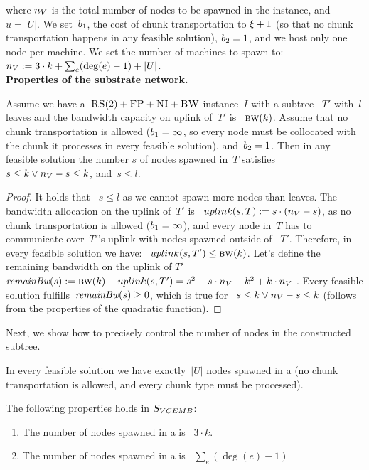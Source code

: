where $n_V$ is the total number of nodes to be spawned in the instance, and $u = |U|$.
  We
set~$b_1$, the cost of chunk transportation to $\xi+1$ (so that no chunk transportation happens in any feasible solution), 
$b_2 = 1$, and we host only one node per machine. We set the
number of machines to spawn to:
$n_V := 3\cdot k + \sum_e (\deg(e)-1) + |U|$.
\\

\noindent \textbf{Properties of the substrate network.}
\begin{lemma}
  Assume we have a~$\textsc{RS}(2)+\textsc{FP}+\textsc{NI}+\textsc{BW}$ instance~$I$ with a subtree
 ~$T'$ with~$l$ leaves and the bandwidth capacity on uplink of~$T'$ is
 ~$\textsc{bw}(k)$. Assume that no chunk transportation is allowed
  ($b_1 = \infty$, so every node must be collocated with the
  chunk it processes in every feasible solution), and~$b_2 = 1$.
  Then in any feasible solution the number $s$ of nodes spawned in~$T$ satisfies~$s \leq k \vee n_V-s\leq k$, and~$s \leq l$.
  \label{lem:bandwidth1}
\end{lemma}

\begin{proof}
It holds that ~$s\leq l$ as we cannot spawn more nodes than leaves.
  The bandwidth allocation on the uplink of~$T'$ is
 ~$uplink(s,T) := s\cdot (n_V - s)$, as no chunk transportation
  is allowed ($b_1 = \infty$), and every node in~$T$ has to
  communicate over~$T'$'s uplink with nodes spawned outside of
 ~$T'$. Therefore, in every feasible solution we have:
 ~$uplink(s, T') \leq \textsc{bw}(k)$.  Let's define the remaining bandwidth
  on the uplink of $T'$~$\textit{remainBw}(s) := \textsc{bw}(k)-uplink(s, T') = s^2 - s\cdot n_V -
  k^2+k\cdot n_V~$.
  Every feasible solution fulfills~$\textit{remainBw}(s) \geq 0$, which is true for
 ~$s \leq k \vee n_V-s\leq k$ (follows from the properties of the
  quadratic function).
\end{proof}


Next, we show how to precisely control the number of nodes in the
constructed subtree.

\begin{obs}
  In every feasible solution we have exactly~$|U|$ nodes spawned in a
  {\UnqSubtree} (no chunk transportation is allowed, and every chunk
  type must be processed).
  \label{obs:unq-full}
\end{obs}


\begin{lemma}
  The following properties holds in $S_{VCEMB}$:
  \begin{enumerate}
    \item The number of nodes spawned in a {\MatchSubtree} is
   ~$3\cdot k$.
    \item The number of nodes spawned in a {\CoverSubtree} is
   ~$\sum_e(\deg(e)-1)$
  \end{enumerate}

  \label{lem:bandwidth2}
\end{lemma}

